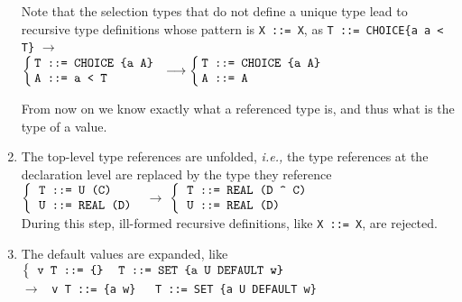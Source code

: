 \begin{enumerate}
        Note that the selection types that do not define a unique type
        lead to recursive type definitions whose pattern is
        \texttt{\small X ::= X}, as \verb+T ::= CHOICE{a a < T}+
        $\longrightarrow$\\
        {\small
         $\left\{\hspace*{-4pt}
            \begin{tabular}{l}
               \verb+T ::= CHOICE {a A}+\\
               \verb+A ::= a < T+
            \end{tabular}
          \right.
         \longrightarrow
         \left\{\hspace*{-4pt}
             \begin{tabular}{l}
                \verb+T ::= CHOICE {a A}+\\
                \verb+A ::= A+
             \end{tabular}
          \right.$
        }

        From now on we know exactly what a referenced
        type is, and thus what is the type of a value.

  \item \label{type_references} The top-level type references are
    unfolded, \emph{i.e.,} the type references at the declaration
    level are replaced by the type they reference\\
        {\small
         $\left\{
             \begin{tabular}{l}
                \verb+T ::= U (C)+\\
                \verb+U ::= REAL (D)+
             \end{tabular}
          \right.$
          $\longrightarrow$
          $\left\{
             \begin{tabular}{l}
                \verb+T ::= REAL (D ^ C)+\\
                \verb+U ::= REAL (D)+
             \end{tabular}
          \right.$}\\
        During this step, ill-formed recursive definitions, like
        \texttt{\small X ::= X}, are rejected.

  \item The default values are expanded, like\\
        {\small
         $\left\{
            \begin{tabular}{ll}
                 \verb+v T ::= {}+ 
               & \verb+T ::= SET {a U DEFAULT w}+
            \end{tabular}
          \right.$\\
          $\longrightarrow$
            \verb+ v T ::= {a w}   T ::= SET {a U DEFAULT w}+
        }


\end{enumerate}
